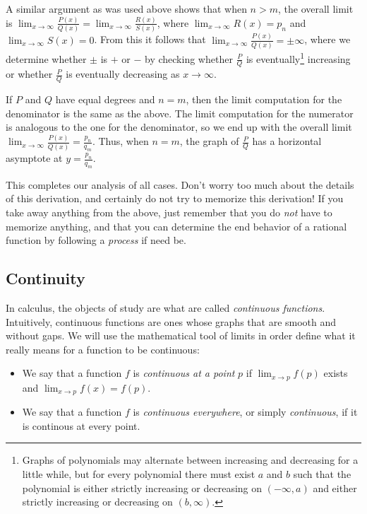 A similar argument as was used above shows that when $n > m$, the overall limit is $\lim_{x \rightarrow \infty} \frac{P(x)}{Q(x)} = \lim_{x \rightarrow \infty} \frac{R(x)}{S(x)}$, where $\lim_{x \rightarrow \infty} R(x) = p_n$ and $\lim_{x \rightarrow \infty} S(x) = 0$. From this it follows that $\lim_{x \rightarrow \infty} \frac{P(x)}{Q(x)} = \pm \infty$, where we determine whether $\pm$ is $+$ or $-$ by checking whether $\frac{P}{Q}$ is eventually\footnote{Graphs of polynomials may alternate between increasing and decreasing for a little while, but for every polynomial there must exist $a$ and $b$ such that the polynomial is either strictly increasing or decreasing on $(-\infty, a)$ and either strictly increasing or decreasing on $(b, \infty)$.} increasing or whether $\frac{P}{Q}$ is eventually decreasing as $x \rightarrow \infty$.

If $P$ and $Q$ have equal degrees and $n = m$, then the limit computation for the denominator is the same as the above. The limit computation for the numerator is analogous to the one for the denominator, so we end up with the overall limit $\lim_{x \rightarrow \infty} \frac{P(x)}{Q(x)} = \frac{p_n}{q_m}$. Thus, when $n = m$, the graph of $\frac{P}{Q}$ has a horizontal asymptote at $y = \frac{p_n}{q_m}$. 

This completes our analysis of all cases. Don't worry too much about the details of this derivation, and certainly do not try to memorize this derivation! If you take away anything from the above, just remember that you do \textit{not} have to memorize anything, and that you can determine the end behavior of a rational function by following a \textit{process} if need be. 

\subsection*{Continuity}

In calculus, the objects of study are what are called \textit{continuous functions}. Intuitively, continuous functions are ones whose graphs that are smooth and without gaps. We will use the mathematical tool of limits in order define what it really means for a function to be continuous:

\begin{itemize}
    \item We say that a function $f$ is \textit{continuous at a point} $p$ if $\lim_{x \rightarrow p} f(p)$ exists and $\lim_{x \rightarrow p} f(x) = f(p)$. 
    \item We say that a function $f$ is \textit{continuous everywhere}, or simply \textit{continuous}, if it is continous at every point.
\end{itemize}

